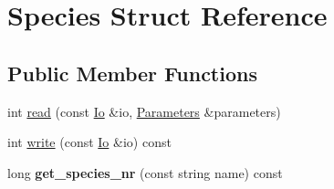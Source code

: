 \hypertarget{structSpecies}{}\section{Species Struct Reference}
\label{structSpecies}
\subsection*{Public Member Functions}
\begin{DoxyCompactItemize}
\item 
int \mbox{\hyperlink{structSpecies_a8816c98e9fdc90c4b8c8aba44859cc44}{read}} (const \mbox{\hyperlink{structIo}{Io}} \&io, \mbox{\hyperlink{classParameters}{Parameters}} \&parameters)
\item 
int \mbox{\hyperlink{structSpecies_a139fe7d058d5eb90e018b0ebd841d107}{write}} (const \mbox{\hyperlink{structIo}{Io}} \&io) const
\item 
\mbox{\label{structSpecies_a4bad6ba4f4074d87721c882532f56067}} 
long {\bfseries get\+\_\+species\+\_\+nr} (const string name) const
\end{DoxyCompactItemize}
